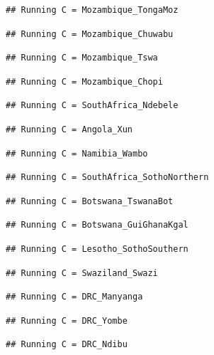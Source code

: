 \documentclass[
]{article}
\begin{document}
\begin{verbatim}
## Running C = Mozambique_TongaMoz
\end{verbatim}

\begin{verbatim}
## Running C = Mozambique_Chuwabu
\end{verbatim}

\begin{verbatim}
## Running C = Mozambique_Tswa
\end{verbatim}

\begin{verbatim}
## Running C = Mozambique_Chopi
\end{verbatim}

\begin{verbatim}
## Running C = SouthAfrica_Ndebele
\end{verbatim}

\begin{verbatim}
## Running C = Angola_Xun
\end{verbatim}

\begin{verbatim}
## Running C = Namibia_Wambo
\end{verbatim}

\begin{verbatim}
## Running C = SouthAfrica_SothoNorthern
\end{verbatim}

\begin{verbatim}
## Running C = Botswana_TswanaBot
\end{verbatim}

\begin{verbatim}
## Running C = Botswana_GuiGhanaKgal
\end{verbatim}

\begin{verbatim}
## Running C = Lesotho_SothoSouthern
\end{verbatim}

\begin{verbatim}
## Running C = Swaziland_Swazi
\end{verbatim}

\begin{verbatim}
## Running C = DRC_Manyanga
\end{verbatim}

\begin{verbatim}
## Running C = DRC_Yombe
\end{verbatim}

\begin{verbatim}
## Running C = DRC_Ndibu
\end{verbatim}
\end{document}
